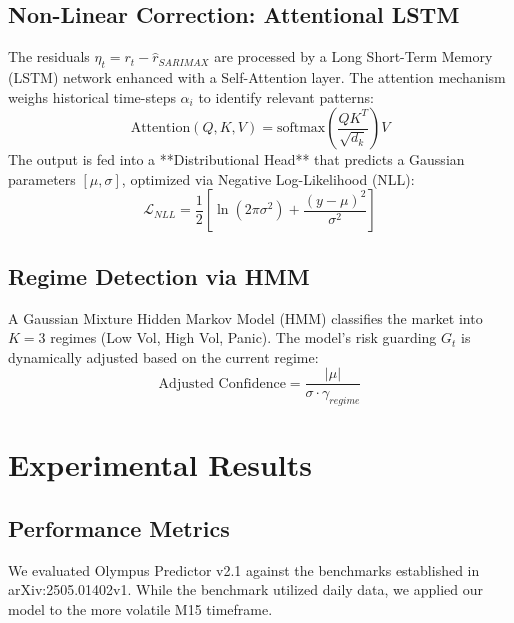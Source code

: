 \documentclass[11pt, a4paper, twocolumn]{article}
\begin{document}
\subsection{Non-Linear Correction: Attentional LSTM}
The residuals $\eta_t = r_t - \hat{r}_{SARIMAX}$ are processed by a Long Short-Term Memory (LSTM) network enhanced with a Self-Attention layer. The attention mechanism weighs historical time-steps $\alpha_i$ to identify relevant patterns:
\begin{equation}
\text{Attention}(Q, K, V) = \text{softmax}\left(\frac{QK^T}{\sqrt{d_k}}\right)V
\end{equation}
The output is fed into a **Distributional Head** that predicts a Gaussian parameters $[\mu, \sigma]$, optimized via Negative Log-Likelihood (NLL):
\begin{equation}
\mathcal{L}_{NLL} = \frac{1}{2} \left[ \ln(2\pi\sigma^2) + \frac{(y - \mu)^2}{\sigma^2} \right]
\end{equation}

\subsection{Regime Detection via HMM}
A Gaussian Mixture Hidden Markov Model (HMM) classifies the market into $K=3$ regimes (Low Vol, High Vol, Panic). The model's risk guarding $G_t$ is dynamically adjusted based on the current regime:
\begin{equation}
\text{Adjusted Confidence} = \frac{|\mu|}{\sigma \cdot \gamma_{regime}}
\end{equation}

\section{Experimental Results}

\subsection{Performance Metrics}
We evaluated Olympus Predictor v2.1 against the benchmarks established in arXiv:2505.01402v1. While the benchmark utilized daily data, we applied our model to the more volatile M15 timeframe.

\begin{table}[ht]
\centering
\caption{Comparative Analysis: Forecast Accuracy and Hit Ratio}
\end{table}
\end{document}
